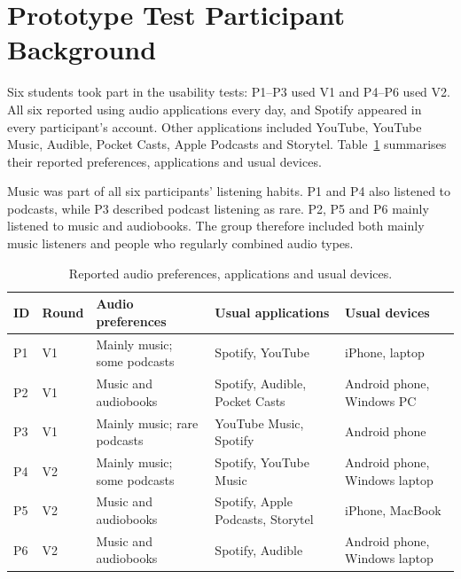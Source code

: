 \section{Prototype Test Participant Background}
\label{sec:results-data-collection}

Six students took part in the usability tests: P1--P3 used V1 and P4--P6
used V2. All six reported using audio applications every day, and Spotify
appeared in every participant's account. Other applications included
YouTube, YouTube Music, Audible, Pocket Casts, Apple Podcasts and Storytel.
Table~\ref{tab:results-participants} summarises their reported preferences,
applications and usual devices.

Music was part of all six participants' listening habits. P1 and P4 also
listened to podcasts, while P3 described podcast listening as rare. P2, P5
and P6 mainly listened to music and audiobooks. The group therefore included
both mainly music listeners and people who regularly combined audio types.

\begin{table}[!htbp]
  \centering
  \caption{Reported audio preferences, applications and usual devices.}
  \label{tab:results-participants}
  \begingroup
  \small
  \renewcommand{\arraystretch}{1.2}
  \newcommand{\resultcell}[1]{{\raggedright #1\par}}
  \begin{tabular}{@{}p{}p{}p{}p{}p{}@{}}
    \hline
    \textbf{ID} & \textbf{Round} & \resultcell{\textbf{Audio preferences}} &
    \resultcell{\textbf{Usual applications}} & \resultcell{\textbf{Usual devices}} \\
    \hline
    P1 & V1 & \resultcell{Mainly music; some podcasts} & \resultcell{Spotify, YouTube} & \resultcell{iPhone, laptop} \\[3pt]
    P2 & V1 & \resultcell{Music and audiobooks} & \resultcell{Spotify, Audible, Pocket Casts} & \resultcell{Android phone, Windows PC} \\[3pt]
    P3 & V1 & \resultcell{Mainly music; rare podcasts} & \resultcell{YouTube Music, Spotify} & \resultcell{Android phone} \\[3pt]
    P4 & V2 & \resultcell{Mainly music; some podcasts} & \resultcell{Spotify, YouTube Music} & \resultcell{Android phone, Windows laptop} \\[3pt]
    P5 & V2 & \resultcell{Music and audiobooks} & \resultcell{Spotify, Apple Podcasts, Storytel} & \resultcell{iPhone, MacBook} \\[3pt]
    P6 & V2 & \resultcell{Music and audiobooks} & \resultcell{Spotify, Audible} & \resultcell{Android phone, Windows laptop} \\
    \hline
  \end{tabular}
  \endgroup
\end{table}

